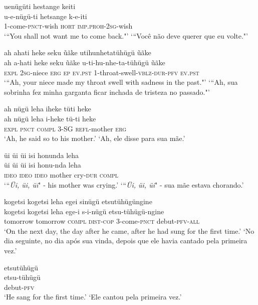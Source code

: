 \documentclass[output=paper,
modfonts,nonflat
]{langsci/langscibook}
\begin{document}
\ea  uenügüti hestange keiti\\[.3em]
\gll u-e-nügü-ti hetsange k-e-iti\\
     \textsc{1}-come-\textsc{pnct}-wish \textsc{hort} \textsc{imp}.\textsc{proh}-\textsc{2sg}-wish\\
\glt ‘“You shall not want me to come back."’
\glt ‘“Você não deve querer que eu volte."’
\z

\ea  ah ahati heke seku ũãke utihunhetatühügü ũãke\\[.3em]
\gll ah a-hati heke seku ũãke u-ti-hu-nhe-ta-tühügü ũãke\\
     \textsc{expl} \textsc{2sg}-niece \textsc{erg} \textsc{ep} \textsc{ev.pst} \textsc{1}-throat-swell-\textsc{vblz}-\textsc{dur}-\textsc{pfv} \textsc{ev.pst}\\
\glt ‘“Ah, your niece made my throat swell with sadness in the past."’
\glt ‘“Ah, sua sobrinha fez minha garganta ficar inchada de tristeza no passado."’
\z

\ea  ah nügü leha iheke tüti heke\\[.3em]
\gll ah nügü leha i-heke tü-ti heke\\
     \textsc{expl} \textsc{pnct} \textsc{compl} 3-SG \textsc{refl}-mother \textsc{erg}\\
\glt ‘Ah, he said so to his mother.’
\glt ‘Ah, ele disse para sua mãe.’
\z

\ea  üi üi üi isi honunda leha\\[.3em]
\gll üi üi üi isi honu-nda leha\\
     \textsc{ideo} \textsc{ideo} \textsc{ideo} mother cry-\textsc{dur} \textsc{compl}\\
\glt ‘“\textit{Üi, üi, üi}" - his mother was crying.’
\glt ‘“\textit{Üi, üi, üi}" - sua mãe estava chorando.’
\z

\ea  kogetsi kogetsi leha egei sinügü etsutühügüngine\\[.3em]
\gll kogetsi kogetsi leha ege-i s-i-nügü etsu-tühügü-ngine\\
     tomorrow tomorrow \textsc{compl} \textsc{dist}-\textsc{cop} 3-come-\textsc{pnct} debut-\textsc{pfv}-\textsc{all}\\
\glt ‘On the next day, the day after he came, after he had sung for the first time.’
\glt ‘No dia seguinte, no dia após sua vinda, depois que ele havia cantado pela primeira vez.’
\z

\ea  etsutühügü\\[.3em]
\gll etsu-tühügü\\
     debut-\textsc{pfv}\\
\glt ‘He sang for the first time.’
\glt ‘Ele cantou pela primeira vez.’
\z
\end{document}
